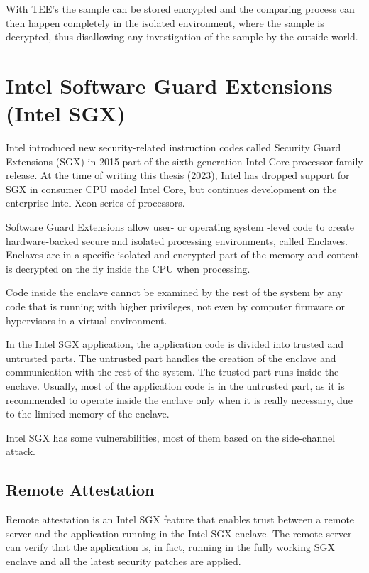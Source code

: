 With TEE's the sample can be stored encrypted and the comparing process can then happen completely in the isolated environment, where the sample is decrypted, thus disallowing any investigation of the sample by the outside world.

\section{Intel Software Guard Extensions (Intel SGX)}\label{sgx}

Intel introduced new security-related instruction codes called Security Guard Extensions (SGX) in 2015 part of the sixth generation Intel Core processor family release. At the time of writing this thesis (2023), Intel has dropped support for SGX in consumer CPU model Intel Core, but continues development on the enterprise Intel Xeon series of processors.

Software Guard Extensions allow user- or operating system -level code to create hardware-backed secure and isolated processing environments, called Enclaves. Enclaves are in a specific isolated and encrypted part of the memory and content is decrypted on the fly inside the CPU when processing.

Code inside the enclave cannot be examined by the rest of the system by any code that is running with higher privileges, not even by computer firmware or hypervisors in a virtual environment.

In the Intel SGX application, the application code is divided into trusted and untrusted parts. The untrusted part handles the creation of the enclave and communication with the rest of the system. The trusted part runs inside the enclave. Usually, most of the application code is in the untrusted part, as it is recommended to operate inside the enclave only when it is really necessary, due to the limited memory of the enclave.\cite{mit}

Intel SGX has some vulnerabilities, most of them based on the side-channel attack.\cite{sgxfail}

\subsection{Remote Attestation}\label{remoteattestation}

Remote attestation is an Intel SGX feature that enables trust between a remote server and the application running in the Intel SGX enclave. The remote server can verify that the application is, in fact, running in the fully working SGX enclave and all the latest security patches are applied.

